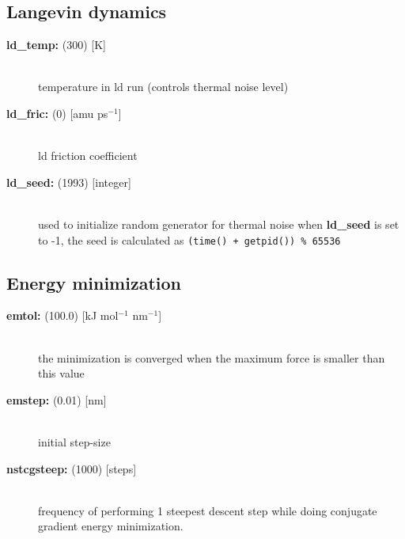 \subsection{Langevin dynamics}
\begin{description}
\item[{\bf ld\_temp: }(300) {[K]}]\mbox{}\\
temperature in ld run (controls thermal noise level)
\item[{\bf ld\_fric: }(0) {[amu ps$^{-1}$]}]\mbox{}\\
ld friction coefficient
\item[{\bf ld\_seed: }(1993) {[integer]}]\mbox{}\\
used to initialize random generator for thermal noise
when {\bf ld\_seed} is set to -1, the seed is calculated as
{\tt (time() + getpid()) \% 65536}
\end{description}

\subsection{Energy minimization}
\begin{description}
\item[{\bf emtol: }(100.0) {[kJ mol$^{-1}$ nm$^{-1}$]}]\mbox{}\\
the minimization is converged when the maximum force is smaller than 
this value
\item[{\bf emstep: }(0.01) {[nm]}]\mbox{}\\
initial step-size
\item[{\bf nstcgsteep: }(1000) {[steps]}]\mbox{}\\
frequency of performing 1 steepest descent step while doing
conjugate gradient energy minimization.
\end{description}

